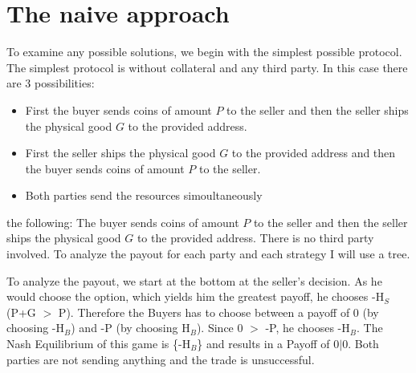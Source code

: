 \documentclass{cacthesis}
\begin{document}
\section{The naive approach}
To examine any possible solutions, we begin with the simplest possible protocol.\newline
The simplest protocol is without collateral and any third party. In this case there are 3 possibilities:
\begin{itemize}
	\item First the buyer sends coins of amount $P$ to the seller and then the seller ships the physical good $G$ to the provided address. 
	\item First the seller ships the physical good $G$ to the provided address and then the buyer sends coins of amount $P$ to the seller. 
	\item Both parties send the resources simoultaneously
\end{itemize}
 the following: The buyer sends coins of amount $P$ to the seller and then the seller ships the physical good $G$ to the provided address. There is no third party involved. 
To analyze the payout for each party and each strategy I will use a tree.\newline


\newline
To analyze the payout, we start at the bottom at the seller's decision. As he would choose the option, which yields him the greatest payoff, he chooses -H$_S$ (P+G $>$ P).\newline
Therefore the Buyers has to choose between a payoff of 0 (by choosing -H$_B$) and -P (by choosing H$_B$). Since 0 $>$ -P, he chooses -H$_B$.\newline
The Nash Equilibrium of this game is \{-H$_B$\} and results in a Payoff of $0|0$. Both parties are not sending anything and the trade is unsuccessful.
\end{document}
